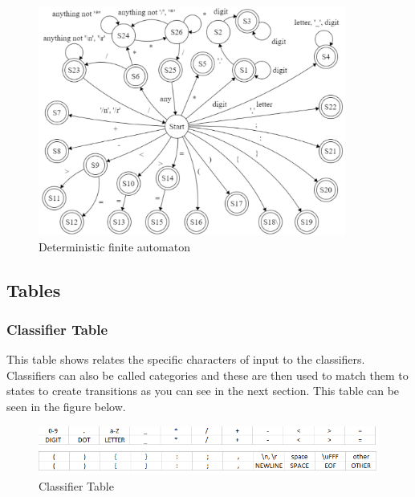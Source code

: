 \documentclass{article}
\begin{document}
				\begin{center}
					\begin{figure}[H]
			 			\includegraphics[width=0.9\textwidth]{automaton.png}
			 			\centering
			  			\caption{Deterministic finite automaton}
			  			\label{fig:automaton}
					\end{figure}
				\end{center}
				
				\subsection{Tables}
				
				\subsubsection{Classifier Table}
				This table shows relates the specific characters of input to the classifiers. Classifiers can also be called categories and these are then used to match them to states to create transitions as you can see in the next section. This table can be seen in the figure below.
				
				\begin{center}
					\begin{figure}[H]
			 			\includegraphics[width=\textwidth]{table3.png}
			  			\caption{Classifier Table}
			  			\label{fig:cat}
					\end{figure}
				\end{center}
				
\end{document}
